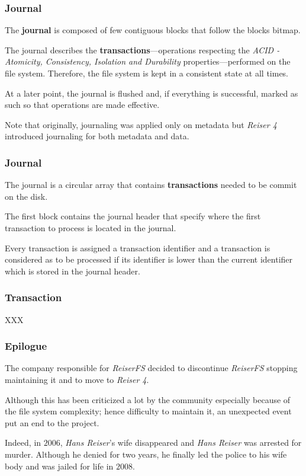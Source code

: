 \begin{frame}
  \frametitle{Journal}

  The \textbf{journal} is composed of few contiguous blocks that follow the
  blocks bitmap.

  \-

  The journal describes the \textbf{transactions}---operations respecting the
  \textit{ACID - Atomicity, Consistency, Isolation and Durability}
  properties---performed on the file system. Therefore, the file system is
  kept in a consistent state at all times.

  \-

  At a later point, the journal is flushed and, if everything is successful,
  marked as such so that operations are made effective.

  \-

  Note that originally, journaling was applied only on metadata but
  \textit{Reiser 4} introduced journaling for both metadata and data.
\end{frame}


\begin{frame}
  \frametitle{Journal}

  The journal is a circular array that contains \textbf{transactions} needed
  to be commit on the disk.

  \-

  The first block contains the journal header that specify where the
  first transaction to process is located in the journal.

  \-

  Every transaction is assigned a transaction identifier and a transaction
  is considered as to be processed if its identifier is lower than the current
  identifier which is stored in the journal header.
\end{frame}


\begin{frame}
  \frametitle{Transaction}

  XXX
\end{frame}


\begin{frame}
  \frametitle{Epilogue}

  The company responsible for \textit{ReiserFS} decided to discontinue
  \textit{ReiserFS} stopping maintaining it and to move to \textit{Reiser 4}.

  \-

  Although this has been criticized a lot by the community especially
  because of the file system complexity; hence difficulty to maintain it,
  an unexpected event put an end to the project.

  \-

  Indeed, in $2006$, \textit{Hans Reiser}'s wife disappeared and \textit{Hans
  Reiser} was arrested for murder. Although he denied for two years,
  he finally led the police to his wife body and was jailed for life in
  $2008$.
\end{frame}


